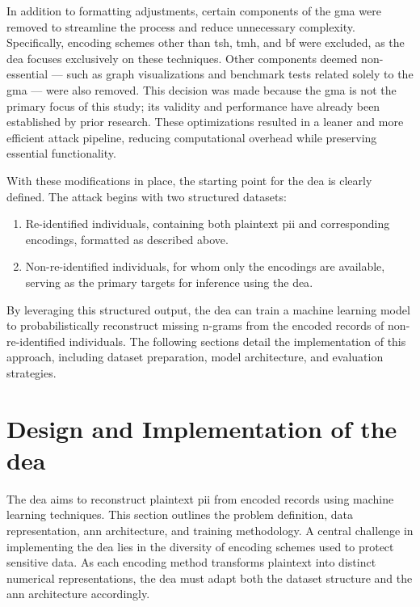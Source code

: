 In addition to formatting adjustments, certain components of the \ac{gma} were removed to streamline the process and reduce unnecessary complexity.
Specifically, encoding schemes other than \ac{tsh}, \ac{tmh}, and \ac{bf} were excluded, as the \ac{dea} focuses exclusively on these techniques.
Other components deemed non-essential — such as graph visualizations and benchmark tests related solely to the \ac{gma} — were also removed.
This decision was made because the \ac{gma} is not the primary focus of this study; its validity and performance have already been established by prior research.
These optimizations resulted in a leaner and more efficient attack pipeline, reducing computational overhead while preserving essential functionality.

With these modifications in place, the starting point for the \ac{dea} is clearly defined.
The attack begins with two structured datasets:

\begin{enumerate}
    \item Re-identified individuals, containing both plaintext \ac{pii} and corresponding encodings, formatted as described above.
    \item Non-re-identified individuals, for whom only the encodings are available, serving as the primary targets for inference using the \ac{dea}.
\end{enumerate}

By leveraging this structured output, the \ac{dea} can train a machine learning model to probabilistically reconstruct missing n-grams from the encoded records of non-re-identified individuals.
The following sections detail the implementation of this approach, including dataset preparation, model architecture, and evaluation strategies.

\section{Design and Implementation of the \ac{dea}} \label{sec:designandimplementation}

The \ac{dea} aims to reconstruct plaintext \ac{pii} from encoded records using machine learning techniques.
This section outlines the problem definition, data representation, \ac{ann} architecture, and training methodology.
A central challenge in implementing the \ac{dea} lies in the diversity of encoding schemes used to protect sensitive data.
As each encoding method transforms plaintext into distinct numerical representations, the \ac{dea} must adapt both the dataset structure and the \ac{ann} architecture accordingly.

